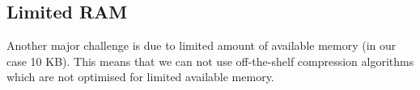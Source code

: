 \documentclass[conference]{IEEEtran}
\begin{document}
\subsection{Limited RAM}
Another major challenge is due to limited amount of available memory (in our case 10 KB). This means that 
we can not use off-the-shelf compression algorithms which are not optimised for limited available memory.
%
%
\end{document}
